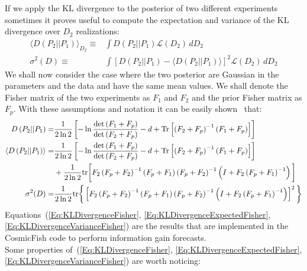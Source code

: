 \documentclass[prd,nofootinbib,showpacs]{revtex4}
\begin{document}
If we apply the KL divergence to the posterior of two different experiments sometimes it proves useful to compute the expectation and variance of the KL divergence over $D_2$ realizations:
%
\begin{align}
\langle D\left( P_2 || P_ 1 \right) \rangle_{D_2} \equiv& \int D\left( P_2 || P_ 1 \right)  \mathcal{L}( D_2 ) \, d D_2 \label{Eq:KLDivergenceExpectation}\\
\sigma^2(D) \equiv& \int \left[ D\left( P_2 || P_ 1 \right) -\langle D\left( P_2 || P_ 1 \right) \rangle \right]^2  \mathcal{L}( D_2 ) \, d D_2 \label{Eq:KLDivergenceVariance}
\end{align}
%
We shall now consider the case where the two posterior are Gaussian in the parameters and the data and have the same mean values. We shall denote the Fisher matrix of the two experiments as $F_1$ and $F_2$ and the prior Fisher matrix as $F_p$. With these assumptions and notation it can be easily shown~\cite{Seehars:2014ora} that:
%
\begin{align}
D\left( P_2 || P_ 1 \right)  =& \frac{1}{2\ln 2} \left[ -\ln \frac{\det \left( F_1+F_p\right) }{\det \left( F_2+F_p \right)} -d +{\rm Tr}\left[ \left( F_2+F_p\right)^{-1} \left( F_1+F_p \right) \right]\right] \label{Eq:KLDivergenceFisher} \\
\langle D\left( P_2 || P_ 1 \right) \rangle  =& \frac{1}{2\ln 2} \left[ -\ln \frac{\det \left( F_1+F_p\right) }{\det \left( F_2+F_p \right)} -d +{\rm Tr}\left[ \left( F_2+F_p\right)^{-1} \left( F_1+F_p \right) \right]\right] \nonumber \\
	&+\frac{1}{2\ln 2} {\rm tr} \bigg[ F_2\left( F_p + F_2 \right)^{-1} \left( F_p + F_1 \right) \left( F_p + F_2 \right)^{-1} \left( I +F_2 \left( F_p + F_1 \right)^{-1} \right) \bigg]  \label{Eq:KLDivergenceExpectedFisher}\\
\sigma^2(D) =& \frac{1}{2\ln 2} {\rm tr} \bigg\{ \left[ F_2\left( F_p + F_2 \right)^{-1} \left( F_p + F_1 \right) \left( F_p + F_2 \right)^{-1} \left( I +F_2 \left( F_p + F_1 \right)^{-1} \right) \right]^2\bigg\}   \label{Eq:KLDivergenceVarianceFisher}
\end{align}
%
Equations~(\ref{Eq:KLDivergenceFisher}, \ref{Eq:KLDivergenceExpectedFisher}, \ref{Eq:KLDivergenceVarianceFisher}) are the results that are implemented in the CosmicFish code to perform information gain forecasts.\\
Some properties of~(\ref{Eq:KLDivergenceFisher}, \ref{Eq:KLDivergenceExpectedFisher}, \ref{Eq:KLDivergenceVarianceFisher}) are worth noticing:
%
\end{document}
